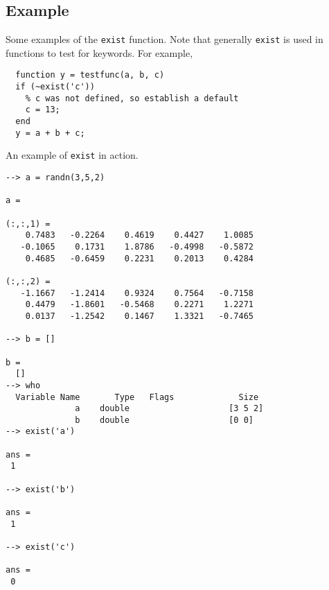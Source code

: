 \subsection{Example}

Some examples of the \verb|exist| function.  Note that generally \verb|exist|
is used in functions to test for keywords.  For example,
\begin{verbatim}
  function y = testfunc(a, b, c)
  if (~exist('c'))
    % c was not defined, so establish a default
    c = 13;
  end
  y = a + b + c;
\end{verbatim}
An example of \verb|exist| in action.
\begin{verbatim}
--> a = randn(3,5,2)

a = 

(:,:,1) = 
    0.7483   -0.2264    0.4619    0.4427    1.0085 
   -0.1065    0.1731    1.8786   -0.4998   -0.5872 
    0.4685   -0.6459    0.2231    0.2013    0.4284 

(:,:,2) = 
   -1.1667   -1.2414    0.9324    0.7564   -0.7158 
    0.4479   -1.8601   -0.5468    0.2271    1.2271 
    0.0137   -1.2542    0.1467    1.3321   -0.7465 

--> b = []

b = 
  []
--> who
  Variable Name       Type   Flags             Size
              a    double                    [3 5 2]
              b    double                    [0 0]
--> exist('a')

ans = 
 1 

--> exist('b')

ans = 
 1 

--> exist('c')

ans = 
 0 
\end{verbatim}
